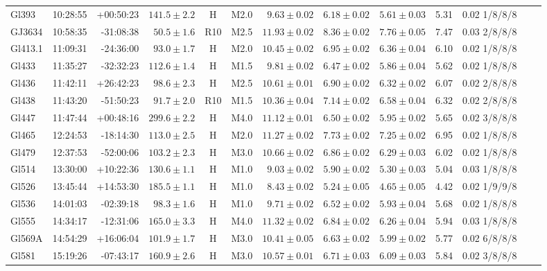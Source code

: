 \documentclass[referee]{aa}
\begin{document}
\begin{table}[h!]
{\begin{tabular}{ l r r r c c r r r r r r r}
Gl393 & 10:28:55 & +00:50:23 & $141.5 \pm  2.2$ & H & M2.0 &  $9.63 \pm 0.02$ & $6.18 \pm 0.02$ & $5.61 \pm 0.03$ & 5.31 & 0.02 1/8/8/8 \\
GJ3634 & 10:58:35 & -31:08:38 & $50.5 \pm  1.6$ & R10 & M2.5 &  $11.93 \pm 0.02$ & $8.36 \pm 0.02$ & $7.76 \pm 0.05$ & 7.47 & 0.03 2/8/8/8 \\
Gl413.1 & 11:09:31 & -24:36:00 & $93.0 \pm  1.7$ & H & M2.0 &  $10.45 \pm 0.02$ & $6.95 \pm 0.02$ & $6.36 \pm 0.04$ & 6.10 & 0.02 1/8/8/8 \\
Gl433 & 11:35:27 & -32:32:23 & $112.6 \pm  1.4$ & H & M1.5 &  $9.81 \pm 0.02$ & $6.47 \pm 0.02$ & $5.86 \pm 0.04$ & 5.62 & 0.02 1/8/8/8 \\
Gl436 & 11:42:11 & +26:42:23 & $98.6 \pm  2.3$ & H & M2.5 &  $10.61 \pm 0.01$ & $6.90 \pm 0.02$ & $6.32 \pm 0.02$ & 6.07 & 0.02 2/8/8/8 \\
Gl438 & 11:43:20 & -51:50:23 & $91.7 \pm  2.0$ & R10 & M1.5 &  $10.36 \pm 0.04$ & $7.14 \pm 0.02$ & $6.58 \pm 0.04$ & 6.32 & 0.02 2/8/8/8 \\
Gl447 & 11:47:44 & +00:48:16 & $299.6 \pm  2.2$ & H & M4.0 &  $11.12 \pm 0.01$ & $6.50 \pm 0.02$ & $5.95 \pm 0.02$ & 5.65 & 0.02 3/8/8/8 \\
Gl465 & 12:24:53 & -18:14:30 & $113.0 \pm  2.5$ & H & M2.0 &  $11.27 \pm 0.02$ & $7.73 \pm 0.02$ & $7.25 \pm 0.02$ & 6.95 & 0.02 1/8/8/8 \\
Gl479 & 12:37:53 & -52:00:06 & $103.2 \pm  2.3$ & H & M3.0 &  $10.66 \pm 0.02$ & $6.86 \pm 0.02$ & $6.29 \pm 0.03$ & 6.02 & 0.02 1/8/8/8 \\
Gl514 & 13:30:00 & +10:22:36 & $130.6 \pm  1.1$ & H & M1.0 &  $9.03 \pm 0.02$ & $5.90 \pm 0.02$ & $5.30 \pm 0.03$ & 5.04 & 0.03 1/8/8/8 \\
Gl526 & 13:45:44 & +14:53:30 & $185.5 \pm  1.1$ & H & M1.0 &  $8.43 \pm 0.02$ & $5.24 \pm 0.05$ & $4.65 \pm 0.05$ & 4.42 & 0.02 1/9/9/8 \\
Gl536 & 14:01:03 & -02:39:18 & $98.3 \pm  1.6$ & H & M1.0 &  $9.71 \pm 0.02$ & $6.52 \pm 0.02$ & $5.93 \pm 0.04$ & 5.68 & 0.02 1/8/8/8 \\
Gl555 & 14:34:17 & -12:31:06 & $165.0 \pm  3.3$ & H & M4.0 &  $11.32 \pm 0.02$ & $6.84 \pm 0.02$ & $6.26 \pm 0.04$ & 5.94 & 0.03 1/8/8/8 \\
Gl569A & 14:54:29 & +16:06:04 & $101.9 \pm  1.7$ & H & M3.0 &  $10.41 \pm 0.05$ & $6.63 \pm 0.02$ & $5.99 \pm 0.02$ & 5.77 & 0.02 6/8/8/8 \\
Gl581 & 15:19:26 & -07:43:17 & $160.9 \pm  2.6$ & H & M3.0 &  $10.57 \pm 0.01$ & $6.71 \pm 0.03$ & $6.09 \pm 0.03$ & 5.84 & 0.02 3/8/8/8 \\

\end{tabular}}
\end{table}
\end{document}
